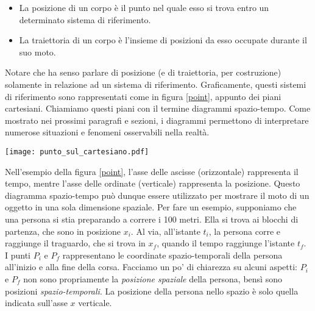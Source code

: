\begin{tcolorbox}[colback = yellow!30, colframe = yellow!30!black, title = {Posizione e traiettoria}]
\begin{itemize}
    \item La posizione di un corpo è il punto nel quale esso si trova entro un
    determinato sistema di riferimento.

    \item La traiettoria di un corpo è l'insieme di posizioni da esso occupate
    durante il suo moto.
\end{itemize}
\end{tcolorbox}

Notare che ha senso parlare di posizione (e di traiettoria, per costruzione)
solamente in relazione ad un sistema di riferimento. Graficamente,
questi sistemi di riferimento sono rappresentati come in figura
\ref{point}, appunto dei piani cartesiani. Chiamiamo questi piani con
il termine diagrammi spazio-tempo. Come mostrato nei prossimi paragrafi
e sezioni, i diagrammi permettono di interpretare numerose situazioni
e fenomeni osservabili nella realtà.

\begin{marginfigure}
    \centering
    \texttt{[image: punto\_sul\_cartesiano.pdf]}
    \label{point}
\end{marginfigure}

Nell'esempio della figura \ref{point}, l'asse delle ascisse (orizzontale)
rappresenta il tempo, mentre l'asse delle ordinate (verticale) rappresenta
la posizione. Questo diagramma spazio-tempo può dunque essere utilizzato
per mostrare il moto di un oggetto in una sola dimensione spaziale. Per
fare un esempio, supponiamo che una persona si stia preparando a correre
i 100 metri. Ella si trova ai blocchi di partenza,
che sono in posizione $x_i$. Al via, all'istante $t_i$, la persona corre
e raggiunge il traguardo, che si trova in $x_f$, quando il tempo raggiunge
l'istante $t_f$. I punti $P_i$ e $P_f$ rappresentano le
coordinate spazio-temporali della persona all'inizio e alla fine della corsa.
Facciamo un po' di chiarezza su alcuni aspetti: $P_i$ e $P_f$ non sono
propriamente la \emph{posizione spaziale} della persona, bensì sono posizioni
\emph{spazio-temporali}. La posizione della persona nello spazio è solo
quella indicata sull'asse $x$ verticale.

